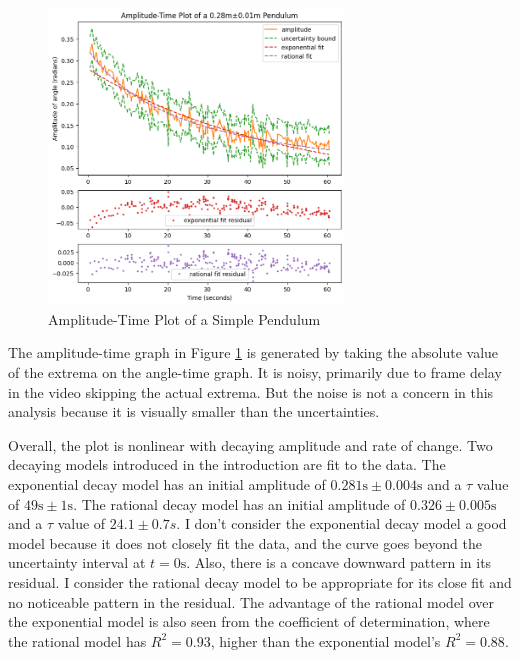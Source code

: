 \documentclass[12pt]{article}
\begin{document}
\begin{figure}[!ht]
\begin{center}
\includegraphics[width=0.7\textwidth]{amplitude-time.png}
\end{center}
\caption{Amplitude-Time Plot of a Simple Pendulum}
\label{fig:amplitude-time}
\end{figure}

The amplitude-time graph in Figure \ref{fig:amplitude-time} is generated by taking the absolute value of the extrema on the angle-time graph. It is noisy, primarily due to frame delay in the video skipping the actual extrema. But the noise is not a concern in this analysis because it is visually smaller than the uncertainties.

Overall, the plot is nonlinear with decaying amplitude and rate of change. Two decaying models introduced in the introduction are fit to the data. The exponential decay model has an initial amplitude of $0.281\mathrm{s}\pm0.004\mathrm{s}$ and a $\tau$ value of $49\mathrm{s}\pm1\mathrm{s}$. The rational decay model has an initial amplitude of $0.326\pm0.005\mathrm{s}$ and a $\tau$ value of $24.1\pm0.7s$. I don't consider the exponential decay model a good model because it does not closely fit the data, and the curve goes beyond the uncertainty interval at $t=0\mathrm{s}$. Also, there is a concave downward pattern in its residual. I consider the rational decay model to be appropriate for its close fit and no noticeable pattern in the residual. The advantage of the rational model over the exponential model is also seen from the coefficient of determination, where the rational model has $R^2=0.93$, higher than the exponential model's $R^2=0.88$.
\end{document}
